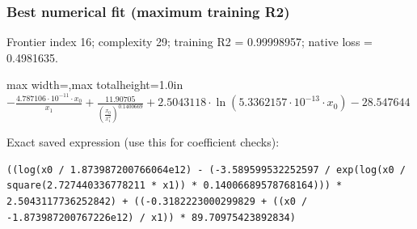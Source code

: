 \documentclass[10pt,letterpaper,landscape]{article}
\begin{document}
\begin{minipage}[t]{0.485\textwidth}
\subsubsection*{Best numerical fit (maximum training R2)}
Frontier index 16; complexity 29; training R2 = 0.99998957; native loss = 0.4981635.
\begin{center}\begin{adjustbox}{max width=\linewidth,max totalheight=1.0in}$\displaystyle - \frac{4.787106 \cdot 10^{-11} \cdot x_{0}}{x_{1}} + \frac{11.90705}{\left(\frac{x_{0}}{x_{1}^{2}}\right)^{0.1400669}} + 2.5043118 \cdot \ln{\left(5.3362157 \cdot 10^{-13} \cdot x_{0} \right)} - 28.547644$\end{adjustbox}\end{center}
{\scriptsize Exact saved expression (use this for coefficient checks):}
\begin{lstlisting}
((log(x0 / 1.873987200766064e12) - (-3.589599532252597 / exp(log(x0 / square(2.727440336778211 * x1)) * 0.14006689578768164))) * 2.5043117736252842) + ((-0.3182223000299829 + ((x0 / -1.873987200767226e12) / x1)) * 89.70975423892834)
\end{lstlisting}
\end{minipage}\hfill
\end{document}
